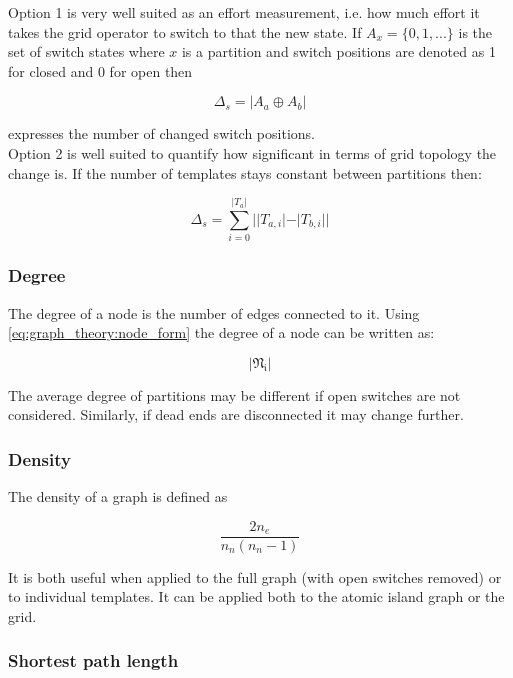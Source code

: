 Option 1 is very well suited as an effort measurement, i.e. how much effort 
it takes the grid operator to switch to that the new state. If $A_x = \{0, 1, ...\}$ 
is the set of switch states where $x$ is a partition and switch positions
are denoted as 1 for closed and 0 for open then

\begin{equation}
\Delta_{s} = |A_a \oplus A_b|
\end{equation}

expresses the number of changed switch positions.\\

Option 2 is well suited to quantify how significant in terms of grid topology 
the change is. If the number of templates stays constant between partitions then:

\begin{equation}
  \Delta_s = \sum_{i=0}^{|T_a|} ||T_{a, i}| - |T_{b, i}||
\end{equation}

\subsubsection{Degree}

The degree of a node is the number of edges connected to it. Using \autoref{eq:graph_theory:node_form}
the degree of a node can be written as:

\begin{equation}
  |\mathfrak{N_i}|
\end{equation}

The average degree
of partitions may be different if open switches are not considered. Similarly, 
if dead ends are disconnected it may change further.

\subsubsection{Density}

The density of a graph is defined as

\begin{equation}
  \frac{2 n_e}{n_n(n_n-1)} 
\end{equation}

It is both useful when applied to the full graph (with open switches removed)
or to individual templates. It can be applied both to the atomic island 
graph or the grid.

\subsubsection{Shortest path length}

